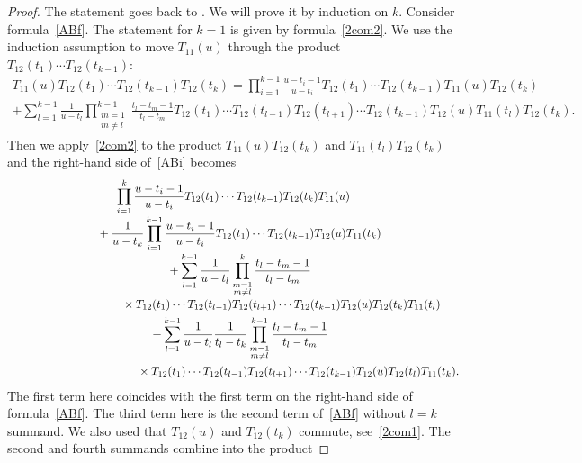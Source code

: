 \documentclass[pdftex]{sigma}
\numberwithin{equation}{section}
\begin{document}
\begin{proof}
The statement goes back to \cite{FT}. We will prove it by induction on $k$. Consider formula~\eqref{ABf}.
The statement for $k=1$ is given by formula~\eqref{2com2}. We use the induction assumption to move $T_{11}(u)$ through the product $T_{12} (t_1) \cdots T_{12} (t_{k-1})$:
\begin{gather} \label{ABi}
T_{11} (u) T_{12} (t_1) \cdots T_{12} (t_{k-1}) T_{12} (t_{k})=\prod_{i=1}^{k-1}\frac{u-t_i-1}{u-t_i} T_{12} (t_1)\cdots T_{12} (t_{k-1}) T_{11} (u)T_{12} (t_{k})\\[-1mm]
+\sum_{l=1}^{k-1} \frac{1}{u-t_l}\prod_{\substack{m=1\\m\neq l}}^{k-1} \frac{t_l-t_m-1}{t_l-t_m} T_{12} (t_1)\cdots T_{12} (t_{l-1}) T_{12} (t_{l+1})\cdots T_{12} (t_{k-1}) T_{12} (u)T_{11} (t_l)T_{12} (t_{k}).\nonumber
\end{gather}
Then we apply~\eqref{2com2} to the product $ T_{11} (u)T_{12} (t_{k})$ and $T_{11} (t_l)T_{12} (t_{k})$ and the right-hand side of~\eqref{ABi} becomes
\begin{gather*}
 \prod_{i=1}^{k}\frac{u-t_i-1}{u-t_i} T_{12} (t_1)\cdots T_{12} (t_{k-1}) T_{12}(t_{k}) T_{11} (u)\\[-1mm]
\quad{}+\frac{1}{u-t_{k}} \prod_{i=1}^{k-1}\frac{u-t_i-1}{u-t_i} T_{12} (t_1)\cdots T_{12} (t_{k-1}) T_{12}(u) T_{11}(t_k) \\[-1mm]
\quad{}+ \sum_{l=1}^{k-1} \frac{1}{u-t_l}\prod_{\substack{m=1\\m\neq l}}^k \frac{t_l-t_m-1}{t_l-t_m} \\[-1mm]
\quad\hphantom{+ \sum_{l=1}^{k-1} \frac{1}{u-t_l}\prod_{\substack{m=1\\m\neq l}}^k}{}\, \times T_{12} (t_1)\cdots T_{12} (t_{l-1}) T_{12} (t_{l+1})\cdots T_{12} (t_{k-1})T_{12} (u) T_{12} (t_{k})T_{11} (t_l)\\
\quad{} +\sum_{l=1}^{k-1} \frac{1}{u-t_l}\frac{1}{t_l-t_k}\prod_{\substack{m=1\\m\neq l}}^{k-1} \frac{t_l-t_m-1}{t_l-t_m} \\
\quad\hphantom{+\sum_{l=1}^{k-1} \frac{1}{u-t_l}\frac{1}{t_l-t_k}\prod_{\substack{m=1\\m\neq l}}^{k-1}}{}\, \times T_{12} (t_1)\cdots T_{12} (t_{l-1}) T_{12} (t_{l+1})\cdots T_{12} (t_{k-1})T_{12} (u) T_{12} (t_l)T_{11} (t_k).
\end{gather*}
The first term here coincides with the first term on the right-hand side of formula~\eqref{ABf}. The third term here is the second term of~\eqref{ABf} without $l=k$ summand. We also used that $T_{12}(u)$ and $T_{12}(t_k)$ commute, see~\eqref{2com1}. The second and fourth summands combine into the product

\end{proof}
\end{document}
